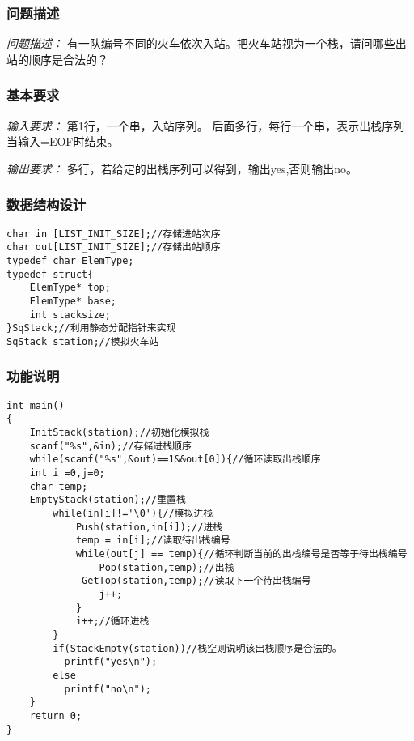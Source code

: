 \documentclass[a4paper,11pt]{article}%
\newenvironment{shadedquotation}
 {\begin{shaded*}
  \quoting[leftmargin=0pt, vskip=0pt]
 }
 {\endquoting
 \end{shaded*}
}
\begin{document}
\subsubsection{问题描述}
\begin{shadedquotation}
    \emph{问题描述：}
    有一队编号不同的火车依次入站。把火车站视为一个栈，请问哪些出站的顺序是合法的？
\end{shadedquotation}
\subsubsection{基本要求}
\begin{shadedquotation}
    \emph{输入要求：}
    第1行，一个串，入站序列。
后面多行，每行一个串，表示出栈序列
当输入=EOF时结束。
\end{shadedquotation}
\begin{shadedquotation}
    \emph{输出要求：}
    多行，若给定的出栈序列可以得到，输出yes,否则输出no。
\end{shadedquotation}
\subsubsection{数据结构设计}
\begin{lstlisting}[language={[ANSI]C},keywordstyle=\color{blue!70},commentstyle=\color{red!50!green!50!blue!50},frame=shadowbox,
				rulesepcolor=\color{red!20!green!20!blue!20}]
char in [LIST_INIT_SIZE];//存储进站次序
char out[LIST_INIT_SIZE];//存储出站顺序
typedef char ElemType;
typedef struct{
	ElemType* top;
	ElemType* base;
	int stacksize;
}SqStack;//利用静态分配指针来实现
SqStack station;//模拟火车站
\end{lstlisting}
\subsubsection{功能说明}
\begin{lstlisting}[language={[ANSI]C},keywordstyle=\color{blue!70},commentstyle=\color{red!50!green!50!blue!50},frame=shadowbox,
				rulesepcolor=\color{red!20!green!20!blue!20}]
int main()
{
	InitStack(station);//初始化模拟栈
	scanf("%s",&in);//存储进栈顺序
	while(scanf("%s",&out)==1&&out[0]){//循环读取出栈顺序
	int i =0,j=0;
	char temp;
	EmptyStack(station);//重置栈
		while(in[i]!='\0'){//模拟进栈
			Push(station,in[i]);//进栈
			temp = in[i];//读取待出栈编号
			while(out[j] == temp){//循环判断当前的出栈编号是否等于待出栈编号
				Pop(station,temp);//出栈
			 GetTop(station,temp);//读取下一个待出栈编号
				j++;
			}
			i++;//循环进栈
		}
		if(StackEmpty(station))//栈空则说明该出栈顺序是合法的。
		  printf("yes\n");
		else
		  printf("no\n");
	}
	return 0;
}
\end{lstlisting}
\end{document}
